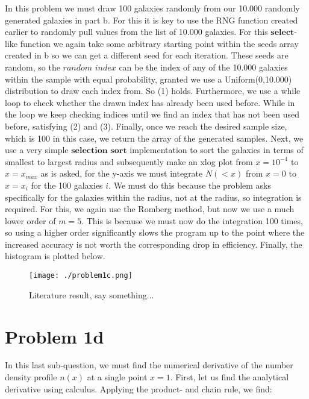 In this problem we must draw 100 galaxies randomly from our 10.000 randomly generated galaxies in part b. For this it is key to use the RNG function created earlier to randomly pull values from the list of 10.000 galaxies. For this $\textbf{select}$-like function we again take some arbitrary starting point within the seeds array created in b so we can get a different seed for each iteration. These seeds are random, so the $\textit{random index}$ can be the index of any of the 10.000 galaxies within the sample with equal probability, granted we use a Uniform(0,10.000) distribution to draw each index from. So (1) holds. Furthermore, we use a while loop to check whether the drawn index has already been used before. While in the loop we keep checking indices until we find an index that has not been used before, satisfying (2) and (3). Finally, once we reach the desired sample size, which is 100 in this case, we return the array of the generated samples. Next, we use a very simple $\textbf{selection sort}$ implementation to sort the galaxies in terms of smallest to largest radius and subsequently make an xlog plot from $x=10^{-4}$ to $x = x_{max}$ as is asked, for the y-axis we must integrate $N(<x)$ from $x=0$ to $x=x_i$ for the 100 galaxies $i$. We must do this because the problem asks specifically for the galaxies within the radius, not at the radius, so integration is required. For this, we again use the Romberg method, but now we use a much lower order of $m=5$. This is because we must now do the integration 100 times, so using a higher order significantly slows the program up to the point where the increased accuracy is not worth the corresponding drop in efficiency. Finally, the histogram is plotted below.

\begin{figure}[h!]
  \centering
  \texttt{[image: ./problem1c.png]}
  \caption{Literature result, say something...}
\end{figure}


\section*{Problem 1d}

In this last sub-question, we must find the numerical derivative of the number density profile $n(x)$ at a single point $x=1$. First, let us find the analytical derivative using calculus. Applying the product- and chain rule, we find:\\

